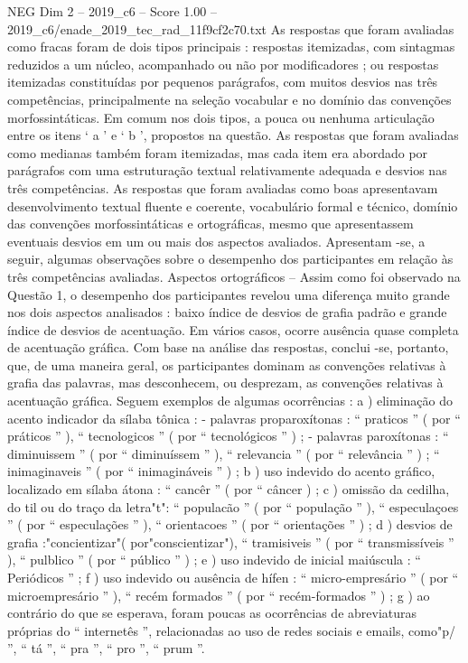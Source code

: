\begin{textsample}{NEG Dim 2 – 2019\_c6 – Score 1.00 – 2019\_c6/enade\_2019\_tec\_rad\_11f9cf2c70.txt}
As respostas que foram avaliadas como fracas foram de dois tipos principais : respostas itemizadas, com sintagmas reduzidos a um núcleo, acompanhado ou não por modificadores ; ou respostas itemizadas constituídas por pequenos parágrafos, com muitos desvios nas três competências, principalmente na seleção vocabular e no domínio das convenções morfossintáticas.
Em comum nos dois tipos, a pouca ou nenhuma articulação entre os itens ‘ a ’ e ‘ b ’, propostos na questão.
As respostas que foram avaliadas como medianas também foram itemizadas, mas cada item era abordado por parágrafos com uma estruturação textual relativamente adequada e desvios nas três competências.
As respostas que foram avaliadas como boas apresentavam desenvolvimento textual fluente e coerente, vocabulário formal e técnico, domínio das convenções morfossintáticas e ortográficas, mesmo que apresentassem eventuais desvios em um ou mais dos aspectos avaliados.
Apresentam -se, a seguir, algumas observações sobre o desempenho dos participantes em relação às três competências avaliadas.
Aspectos ortográficos – Assim como foi observado na Questão 1, o desempenho dos participantes revelou uma diferença muito grande nos dois aspectos analisados : baixo índice de desvios de grafia padrão e grande índice de desvios de acentuação.
Em vários casos, ocorre ausência quase completa de acentuação gráfica.
Com base na análise das respostas, conclui -se, portanto, que, de uma maneira geral, os participantes dominam as convenções relativas à grafia das palavras, mas desconhecem, ou desprezam, as convenções relativas à acentuação gráfica.
Seguem exemplos de algumas ocorrências : a ) eliminação do acento indicador da sílaba tônica : - palavras proparoxítonas : “ praticos ” ( por “ práticos ” ), “ tecnologicos ” ( por “ tecnológicos ” ) ; - palavras paroxítonas : “ diminuissem ” ( por “ diminuíssem ” ), “ relevancia ” ( por “ relevância ” ) ; “ inimaginaveis ” ( por “ inimagináveis ” ) ; b ) uso indevido do acento gráfico, localizado em sílaba átona : “ cancêr ” ( por “ câncer ) ; c ) omissão da cedilha, do til ou do traço da letra"t": “ populacão ” ( por “ população ” ), “ especulaçoes ” ( por “ especulações ” ), “ orientacoes ” ( por “ orientações ” ) ; d ) desvios de grafia :"concientizar"( por"conscientizar"), “ tramisiveis ” ( por “ transmissíveis ” ), “ pulblico ” ( por “ público ” ) ; e ) uso indevido de inicial maiúscula : “ Periódicos ” ; f ) uso indevido ou ausência de hífen : “ micro-empresário ” ( por “ microempresário ” ), “ recém formados ” ( por “ recém-formados ” ) ; g ) ao contrário do que se esperava, foram poucas as ocorrências de abreviaturas próprias do “ internetês ”, relacionadas ao uso de redes sociais e emails, como"p/ ”, “ tá ”, “ pra ”, “ pro ”, “ prum ”.

\end{textsample}
